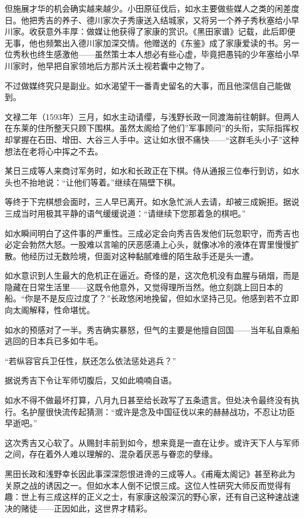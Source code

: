 \documentclass[
]{article}
\begin{document}
但施展才华的机会确实越来越少。小田原征伐后，如水主要做些媒人之类的闲差度日。他把秀吉的养子、德川家次子秀康送入结城家，又将另一个养子秀秋塞给小早川家。收获意外丰厚：做媒让他获得了家康的赏识。《黑田家谱》记载，此后即便无事，他也频繁出入德川家加深交情。他赠送的《东鉴》成了家康爱读的书。另一位秀秋也终生感激他------虽然策士本人想必有些心虚，毕竟把愚钝的少年塞给小早川家时，他早把自家领地后方那片沃土视若囊中之物了。

不过做媒终究只是副业。如水渴望干一番青史留名的大事，而且他深信自己能做到。

文禄二年（1593年）三月，如水主动请缨，与浅野长政一同渡海前往朝鲜。但两人在东莱的住所整天只顾下围棋。虽然太阁给了他们''军事顾问''的头衔，实际指挥权却掌握在石田、增田、大谷三人手中。这让如水很不痛快------``这群毛头小子''这种想法在老将心中挥之不去。

某日三成等人来商讨军务时，如水和长政正在下棋。侍从通报三位奉行到访，如水头也不抬地说：``让他们等着。''继续在隔壁下棋。

等终于下完棋想会面时，三人早已离开。如水急忙派人去请，却被三成婉拒。据说三成当时用极其平静的语气缓缓说道：``请继续下您那着急的棋吧。''

如水瞬间明白了这件事的严重性。三成必定会向秀吉告发他们玩忽职守，而秀吉也必定会勃然大怒。一股难以言喻的厌恶感涌上心头，就像冰冷的液体在胃里慢慢扩散。他经历过无数险境，但面对这种黏腻难缠的陌生敌手还是头一遭。

如水意识到人生最大的危机正在逼近。奇怪的是，这次危机没有血腥与硝烟，而是隐藏在日常生活里------这既令他意外，又觉得理所当然。他立刻跳上回日本的船。``你是不是反应过度了？''长政悠闲地挽留，但如水坚持己见。他感到若不立即向太阁解释，性命堪忧。

如水的预感对了一半。秀吉确实暴怒，但气的主要是他擅自回国------当年私自乘船逃回的日本兵已多如牛毛。

``若纵容官兵卫任性，朕还怎么依法惩处逃兵？''

据说秀吉下令让军师切腹后，又如此喃喃自语。

如水不得不做最坏打算，八月九日甚至给长政写了五条遗言。但处决令最终没有执行。名护屋很快流传起猜测：``或许是念及中国征伐以来的赫赫战功，不忍让功臣早逝吧。''

这次秀吉又心软了。从赐封丰前到如今，想来竟是一直在让步。或许天下人与军师之间，存在着外人难以理解的、混杂着厌恶与眷恋的孽缘。

黑田长政和浅野幸长因此事深深怨恨进谗的三成等人。《甫庵太阁记》甚至称此为关原之战的诱因之一。但如水本人倒不记恨三成。这位人性研究大师反而觉得有趣：世上有三成这样的正义之士，有家康这般深沉的野心家，还有自己这种速战速决的赌徒------正因如此，这世界才精彩。
\end{document}
